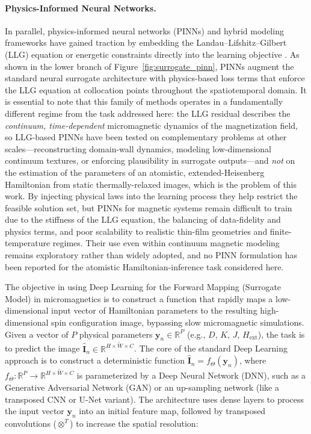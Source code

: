 \documentclass[letterpaper, 12, one column]{article}
\begin{document}
\paragraph{Physics-Informed Neural Networks.}
In parallel, physics-informed neural networks (PINNs) and hybrid modeling frameworks have gained traction by embedding the Landau–Lifshitz–Gilbert (LLG) equation or energetic constraints directly into the learning objective \cite{Karniadakis2021PINNs}. As shown in the lower branch of Figure~\ref{fig:surrogate_pinn}, PINNs augment the standard neural surrogate architecture with physics-based loss terms that enforce the LLG equation at collocation points throughout the spatiotemporal domain. It is essential to note that this family of methods operates in a fundamentally different regime from the task addressed here: the LLG residual describes the \emph{continuum, time-dependent} micromagnetic dynamics of the magnetization field, so LLG-based PINNs have been tested on complementary problems at other scales---reconstructing domain-wall dynamics, modeling low-dimensional continuum textures, or enforcing plausibility in surrogate outputs---and \emph{not} on the estimation of the parameters of an atomistic, extended-Heisenberg Hamiltonian from static thermally-relaxed images, which is the problem of this work. By injecting physical laws into the learning process they help restrict the feasible solution set, but PINNs for magnetic systems remain difficult to train due to the stiffness of the LLG equation, the balancing of data-fidelity and physics terms, and poor scalability to realistic thin-film geometries and finite-temperature regimes. Their use even within continuum magnetic modeling remains exploratory rather than widely adopted, and no PINN formulation has been reported for the atomistic Hamiltonian-inference task considered here.

The objective in using Deep Learning for the Forward Mapping (Surrogate Model) in micromagnetics is to construct a function that rapidly maps a low-dimensional input vector of Hamiltonian parameters to the resulting high-dimensional spin configuration image, bypassing slow micromagnetic simulations. Given a vector of $P$ physical parameters $\mathbf{y}_n \in \mathbb{R}^{P}$ (e.g., $D$, $K$, $J$, $H_{\text{ext}}$), the task is to predict the image $\mathbf{\hat{I}}_n \in \mathbb{R}^{H \times \tilde{W} \times C}$. The core of the standard Deep Learning approach is to construct a deterministic function $\mathbf{\hat{I}}_n = f_{\Theta}(\mathbf{y}_n)$, where $f_{\Theta} : \mathbb{R}^{P} \to \mathbb{R}^{H \times \tilde{W} \times C}$ is parameterized by a Deep Neural Network (DNN), such as a Generative Adversarial Network (GAN) or an up-sampling network (like a transposed CNN or U-Net variant). The architecture uses dense layers to process the input vector $\mathbf{y}_n$ into an initial feature map, followed by transposed convolutions ($\otimes^T$) to increase the spatial resolution:
\end{document}
